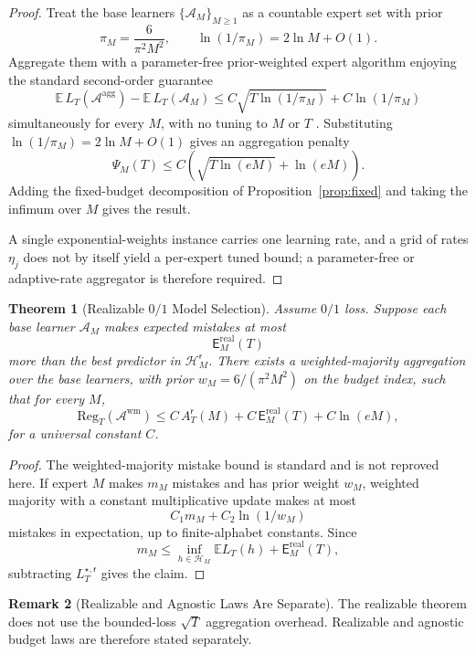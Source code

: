 \documentclass[12pt]{article}
\newtheorem{theorem}{Theorem}[section]
\theoremstyle{definition}
\newtheorem{remark}[theorem]{Remark}
\newcommand{\Hcal}{\mathcal H}
\newcommand{\Reg}{\mathrm{Reg}}
\newcommand{\Est}{\mathsf E}
\newcommand{\Aapp}{A_T}
\newcommand{\PsiAgg}{\Psi}
\begin{document}
\begin{proof}
Treat the base learners $\{\mathcal A_M\}_{M\ge1}$ as a countable expert set
with prior
\[
\pi_M=\frac{6}{\pi^2M^2},
\qquad
\ln(1/\pi_M)=2\ln M+O(1).
\]
Aggregate them with a parameter-free prior-weighted expert algorithm enjoying
the standard second-order guarantee
\[
\mathbb E\,L_T(\mathcal A^{\mathrm{agg}})
-
\mathbb E\,L_T(\mathcal A_M)
\le
C\sqrt{T\ln(1/\pi_M)}
+
C\ln(1/\pi_M)
\]
simultaneously for every $M$, with no tuning to $M$ or $T$
\cite{cesabianchi2006,derooij2014}.  Substituting
$\ln(1/\pi_M)=2\ln M+O(1)$ gives an aggregation penalty
\[
\PsiAgg_M(T)
\le
C\left(
\sqrt{T\ln(eM)}
+
\ln(eM)
\right).
\]
Adding the fixed-budget decomposition of Proposition~\ref{prop:fixed} and
taking the infimum over $M$ gives the result.

A single exponential-weights instance carries one learning rate, and a grid of
rates $\eta_j$ does not by itself yield a per-expert tuned bound; a
parameter-free or adaptive-rate aggregator is therefore required.
\end{proof}

\begin{theorem}[Realizable $0/1$ Model Selection]
\label{thm:oracle-realizable}
Assume $0/1$ loss.  Suppose each base learner $\mathcal A_M$ makes expected
mistakes at most
\[
\Est_M^{\mathrm{real}}(T)
\]
more than the best predictor in $\Hcal_M^{\mathsf r}$.  There exists a
weighted-majority aggregation over the base learners, with prior
$w_M=6/(\pi^2M^2)$ on the budget index, such that for every $M$,
\[
\Reg_T(\mathcal A^{\mathrm{wm}})
\le
C\,\Aapp^{\mathsf r}(M)
+
C\,\Est_M^{\mathrm{real}}(T)
+
C\ln(eM),
\]
for a universal constant $C$.
\end{theorem}

\begin{proof}
The weighted-majority mistake bound is standard
\cite{littlestone1988,cesabianchi2006} and is not reproved here.  If expert $M$ makes $m_M$
mistakes and has prior weight $w_M$, weighted majority with a constant
multiplicative update makes at most
\[
C_1 m_M+C_2\ln(1/w_M)
\]
mistakes in expectation, up to finite-alphabet constants.  Since
\[
m_M
\le
\inf_{h\in\Hcal_M}\mathbb E L_T(h)
+
\Est_M^{\mathrm{real}}(T),
\]
subtracting $L_T^{\star,\mathsf r}$ gives the claim.
\end{proof}

\begin{remark}[Realizable and Agnostic Laws Are Separate]
\label{rem:realizable-not-agnostic}
The realizable theorem does not use the bounded-loss $\sqrt T$ aggregation
overhead.  Realizable and agnostic budget laws are therefore stated
separately.
\end{remark}
\end{document}
